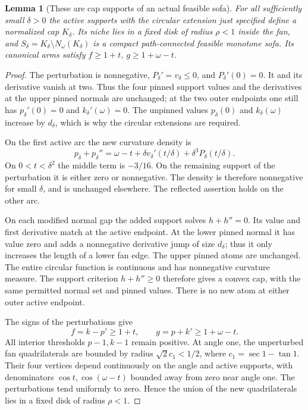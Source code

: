 \documentclass[11pt]{article}
\newtheorem{lemma}{Lemma}
\begin{document}
\begin{lemma}[These are cap supports of an actual feasible sofa]
For all sufficiently small $\delta>0$ the active supports with the circular extension just specified define a normalized cap $K_\delta$. Its niche lies in a fixed disk of radius $\rho<1$ inside the fan, and $S_\delta=K_\delta\setminus N_\omega(K_\delta)$ is a compact path-connected feasible monotone sofa. Its canonical arms satisfy $f\ge1+t$, $g\ge1+\omega-t$.
\end{lemma}
\begin{proof}
The perturbation is nonnegative, $P_\delta'=v_\delta\le0$, and $P_\delta'(0)=0$. It and its derivative vanish at two. Thus the four pinned support values and the derivatives at the upper pinned normals are unchanged; at the two outer endpoints one still has $p_\delta'(0)=0$ and $k_\delta'(\omega)=0$. The unpinned values $p_\delta(0)$ and $k_\delta(\omega)$ increase by $d_\delta$, which is why the circular extensions are required.

On the first active arc the new curvature density is
\[
 p_\delta+p_\delta''=\omega-t+\delta v_\delta'(t/\delta)+\delta^3P_\delta(t/\delta).
\]
On $0<t<\delta^2$ the middle term is $-3/16$. On the remaining support of the perturbation it is either zero or nonnegative. The density is therefore nonnegative for small $\delta$, and is unchanged elsewhere. The reflected assertion holds on the other arc.

On each modified normal gap the added support solves $h+h''=0$. Its value and first derivative match at the active endpoint. At the lower pinned normal it has value zero and adds a nonnegative derivative jump of size $d_\delta$; thus it only increases the length of a lower fan edge. The upper pinned atoms are unchanged. The entire circular function is continuous and has nonnegative curvature measure. The support criterion $h+h''\ge0$ therefore gives a convex cap, with the same permitted normal set and pinned values. There is no new atom at either outer active endpoint.

The signs of the perturbations give
\[
 f=k-p'\ge1+t,\qquad g=p+k'\ge1+\omega-t.
\]
All interior thresholds $p-1,k-1$ remain positive. At angle one, the unperturbed fan quadrilaterals are bounded by radius $\sqrt2c_1<1/2$, where $c_1=\sec1-\tan1$. Their four vertices depend continuously on the angle and active supports, with denominators $\cos t,\cos(\omega-t)$ bounded away from zero near angle one. The perturbations tend uniformly to zero. Hence the union of the new quadrilaterals lies in a fixed disk of radius $\rho<1$.


\end{proof}
\end{document}
